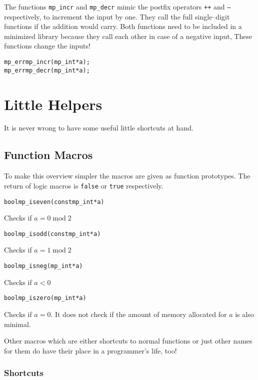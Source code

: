 \documentclass[synpaper]{book}
\begin{document}
The functions \texttt{mp\_incr} and \texttt{mp\_decr} mimic the postfix operators \texttt{++} and
\texttt{--} respectively, to increment the input by one. They call the full single--digit functions
if the addition would carry. Both functions need to be included in a minimized library because they
call each other in case of a negative input, These functions change the inputs!

 
\begin{alltt}
mp_err mp_incr(mp_int *a);
mp_err mp_decr(mp_int *a);
\end{alltt}

\chapter{Little Helpers}
It is never wrong to have some useful little shortcuts at hand.

\section{Function Macros}
To make this overview simpler the macros are given as function prototypes. The return of logic
macros is \texttt{false} or \texttt{true} respectively.

\begin{alltt}
bool mp_iseven(const mp_int *a)
\end{alltt}
Checks if $a = 0 \;\mathrm{mod}\; 2$

\begin{alltt}
bool mp_isodd(const mp_int *a)
\end{alltt}
Checks if $a = 1 \;\mathrm{mod}\; 2$

\begin{alltt}
bool mp_isneg(mp_int *a)
\end{alltt}
Checks if $a < 0$

\begin{alltt}
bool mp_iszero(mp_int *a)
\end{alltt}
Checks if $a = 0$. It does not check if the amount of memory allocated for $a$ is also minimal.

Other macros which are either shortcuts to normal functions or just other names for them do have
their place in a programmer's life, too!

\subsection{Shortcuts}
\end{document}
